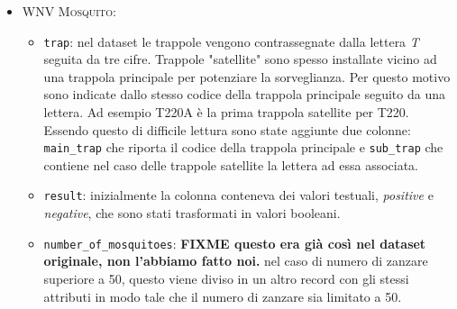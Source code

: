 \begin{itemize}
\begin{itemize}
            \item \texttt{stn\_pressure}, \texttt{sea\_level}: i valori di 
                pressione sono stati convertiti da pollici di mercurio (inHg) a 
                millimetri di mercurio (mmHg).

            \item \texttt{result\_speed}, \texttt{avg\_speed}, \texttt{max5\_speed}, 
            	\texttt{max2\_speed}: i valori di velocità sono stati convertiti da
            	miglia orarie (mph) a chilometri orari 
            	(\si[per-mode=symbol]{\km\per\hour}).
            
            \item \texttt{code\_sum}: questo attributo corrisponde ad una lista di 
            	codici che possono essere assegnati a ciascuna rilevazione, 
            	corrispondenti ai diversi tipi di precipitazioni e altri fenomeni
            	meteorologici (ad es. pioggia, neve, nebbia, \dots). Dato che a 
            	ciascuna rilevazione può essere assegnato più di un codice, è stato
            	necessario effettuare un parsing dei valori, creando una colonna per
            	ogni codice utilizzato.
        \end{itemize}
	
	\item \textsc{WNV Mosquito}:
	
	\begin{itemize}
		
		\item \texttt{trap}: nel dataset le trappole vengono contrassegnate 
		dalla lettera \textit{T} seguita da tre cifre. Trappole "satellite" 
		sono spesso installate vicino ad una trappola principale per potenziare 
		la sorveglianza. Per questo motivo sono indicate dallo stesso codice 
		della trappola principale seguito da una lettera. Ad esempio T220A è la 
		prima trappola satellite per T220. Essendo questo di difficile lettura 
		sono state aggiunte due colonne: \texttt{main\_trap} che riporta il 
		codice della trappola principale e \texttt{sub\_trap} che contiene nel 
		caso delle trappole satellite la lettera ad essa associata.
		
		\item \texttt{result}: inizialmente la colonna conteneva dei valori  
		testuali, \textit{positive} e \textit{negative}, che sono stati 
		trasformati in valori booleani.  
		
		\item \texttt{number\_of\_mosquitoes}: \textbf{FIXME questo era già 
		così nel dataset originale, non l'abbiamo fatto noi.} nel caso di 
		numero di zanzare superiore a 50, questo viene diviso in un altro 
		record con gli stessi attributi in modo tale che il numero di zanzare 
		sia limitato a 50.  
			
	\end{itemize}
	
\end{itemize}


